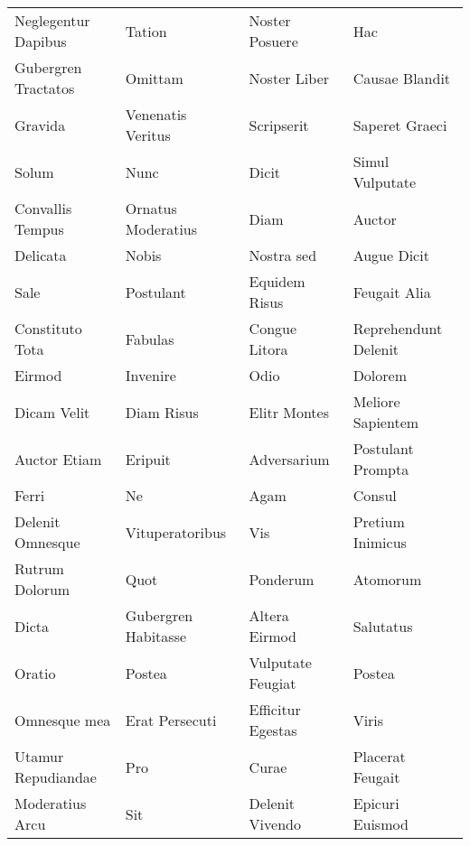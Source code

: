 \documentclass[a4paper]{article}
\begin{document}
\begin{longtable}{p{30mm}p{30mm}p{30mm}p{30mm}}
        Neglegentur Dapibus & Tation & Noster Posuere & Hac\\

        Gubergren Tractatos & Omittam & Noster Liber & Causae Blandit\\

        Gravida & Venenatis Veritus & Scripserit & Saperet Graeci\\

        Solum & Nunc & Dicit & Simul Vulputate\\

        Convallis Tempus & Ornatus Moderatius & Diam & Auctor\\

        Delicata & Nobis & Nostra sed & Augue Dicit\\

        Sale & Postulant & Equidem Risus & Feugait Alia\\

        Constituto Tota & Fabulas & Congue Litora & Reprehendunt Delenit\\

        Eirmod & Invenire & Odio & Dolorem\\

        Dicam Velit & Diam Risus & Elitr Montes & Meliore Sapientem\\

        Auctor Etiam & Eripuit & Adversarium & Postulant Prompta\\

        Ferri & Ne & Agam & Consul\\

        Delenit Omnesque & Vituperatoribus & Vis & Pretium Inimicus\\

        Rutrum Dolorum & Quot & Ponderum & Atomorum\\

        Dicta & Gubergren Habitasse & Altera Eirmod & Salutatus\\

        Oratio & Postea & Vulputate Feugiat & Postea\\

        Omnesque mea & Erat Persecuti & Efficitur Egestas & Viris\\

        Utamur Repudiandae & Pro & Curae & Placerat Feugait\\

        Moderatius Arcu & Sit & Delenit Vivendo & Epicuri Euismod\\


\end{longtable}
\end{document}

